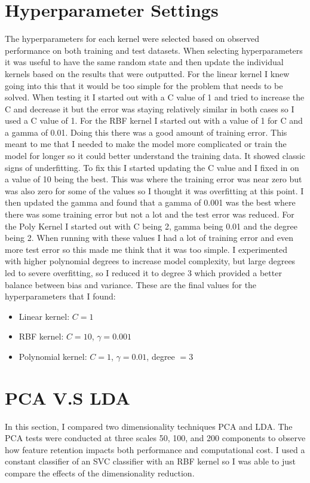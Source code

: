\documentclass{article}
\begin{document}
\section{Hyperparameter Settings}
The hyperparameters for each kernel were selected based on observed performance on both training and test datasets. When selecting hyperparameters it was useful to have the same random state and then update the individual kernels based on the results that were outputted. For the linear kernel I knew going into this that it would be too simple for the problem that needs to be solved. When testing it I started out with a C value of 1 and tried to increase the C and decrease it but the error was staying relatively similar in both cases so I used a C value of 1. For the RBF kernel I started out with a value of 1 for C and a gamma of 0.01. Doing this there was a good amount of training error. This meant to me that I needed to make the model more complicated or train the model for longer so it could better understand the training data. It showed classic signs of underfitting. To fix this I started updating the C value and I fixed in on a value of 10 being the best. This was where the training error was near zero but was also zero for some of the values so I thought it was overfitting at this point. I then updated the gamma and found that a gamma of 0.001 was the best where there was some training error but not a lot and the test error was reduced. For the Poly Kernel I started out with C being 2, gamma being 0.01 and the degree being 2. When running with these values I had a lot of training error and even more test error so this made me think that it was too simple. I experimented with higher polynomial degrees to increase model complexity, but large degrees led to severe overfitting, so I reduced it to degree 3 which provided a better balance between bias and variance. These are the final values for the hyperparameters that I found:
\begin{itemize}
    \item Linear kernel: $C = 1$
    \item RBF kernel: $C = 10$, $\gamma = 0.001$
    \item Polynomial kernel: $C = 1$, $\gamma = 0.01$, degree $= 3$
\end{itemize}

\section{PCA V.S LDA}
In this section, I compared two dimensionality techniques PCA and LDA. The PCA tests were conducted at three scales 50, 100, and 200 components to observe how feature retention impacts both performance and computational cost. I used a constant classifier of an SVC classifier with an RBF kernel so I was able to just compare the effects of the dimensionality reduction.  
\end{document}
